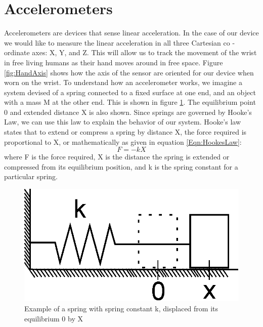 \section{Accelerometers}
\label{Sec:Accelerometer}
Accelerometers are devices that sense linear acceleration.
In the case of our device we would like to measure the linear acceleration in all three Cartesian co - ordinate axes: X, Y, and Z.
This will allow us to track the movement of the wrist in free living humans as their hand moves around in free space.
Figure \ref{fig:HandAxis} shows how the axis of the sensor are oriented for our device when worn on the wrist.
To understand how an accelerometer works,
we imagine a system devised of a spring connected to a fixed surface at one end,
and an object with a mass M at the other end. This is shown in figure \ref{fig:HookeSpring}.
The equilibrium point 0 and extended distance X is also shown.
Since springs are governed by Hooke's Law, we can use this law to explain the behavior of our system.
Hooke's law states that to extend or compress a spring by distance X,
the force required is proportional to X, or mathematically as given in equation \ref{Eqn:HookesLaw}:
\begin{equation}
\label{Eqn:HookesLaw}
F = -kX 
\end{equation}
where F is the force required, X is the distance the spring is extended or compressed from its equilibrium position, and k is the spring constant for a particular spring.
\begin{figure}
\begin{center}
\includegraphics{images/HookesLaw.eps}
\caption{Example of a spring with spring constant k, displaced from its equilibrium 0 by X}
\label{fig:HookeSpring}
\end{center}
\end{figure}

